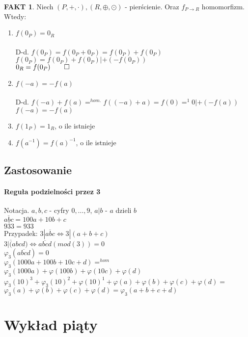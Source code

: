 \documentclass{article}
\theoremstyle{definition}
\theoremstyle{definition}
\theoremstyle{definition}
\theoremstyle{definition}
\newtheorem*{fakt}{FAKT}
\begin{document}
\begin{fakt}
Niech $(P,+,\cdot), (R, \oplus, \odot)$ - pierścienie. Oraz $f_{P\rightarrow R}$ homomorfizm. Wtedy:
\begin{enumerate}
\item $f(0_P)=0_R$\\\\
D-d. $f(0_P)=f(0_P+0_P)=f(0_P)+f(0_P)$\\
$f(0_P)=f(0_P)+f(0_P) | +(-f(0_P))$\\
$0_R=f(0_P)\qed$
\item $f(-a)=-f(a)$\\\\
D-d. $f(-a)+f(a)=^{hom.} f((-a)+a)=f(0)=^{1}0 | + (-f(a))$\\
$f(-a)=-f(a)$
\item $f(1_P)=1_R$, o ile istnieje
\item $f(a^{-1})=f(a)^{-1}$, o ile istnieje
\end{enumerate}
\end{fakt}

\subsection{Zastosowanie}

\paragraph{Reguła podzielności przez 3}
Notacja. $a,b,c$ - cyfry $0,\dots, 9$, $a|b$ - $a$ dzieli $b$ \\ 
$\overline{abc}=100a + 10b + c$\\
$\overline{933}=933$\\
Przypadek: $3|\overline{abc} \iff 3| (a+b+c)$\\
$3|\overline(abcd) \iff \overline{abcd} (mod (3)) = 0$\\
$\varphi_3(\overline{abcd})=0$\\
$\varphi_3(1000a+100b+10c+d)=^{hom}$\\
$\varphi_3(1000a)+\varphi(100b)+\varphi(10c)+\varphi(d)$\\
$\varphi_3(10)^3+\varphi_3(10)^2+\varphi(10)^1+\varphi(a)+\varphi(b)+\varphi(c)+\varphi(d)=$\\
$\varphi_3(a)+\varphi(b)+\varphi(c)+\varphi(d)=\varphi_3(a+b+c+d)$

\section{Wykład piąty}
\end{document}
